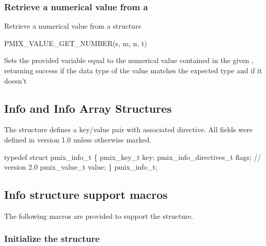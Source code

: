 \subsubsection{Retrieve a numerical value from a }

Retrieve a numerical value from a  structure

\cspecificstart
\begin{codepar}
PMIX_VALUE_GET_NUMBER(s, m, n, t)
\end{codepar}
\cspecificend

\begin{arglist}
\end{arglist}

Sets the provided variable equal to the numerical value contained in the given , returning success if the data type of the value matches the expected type and  if it doesn't

\subsection{Info and Info Array Structures}

The  structure defines a key/value pair with associated directive. All fields were defined in version 1.0 unless otherwise marked.

\cspecificstart
\begin{codepar}
typedef struct pmix_info_t \{
    pmix_key_t key;
    pmix_info_directives_t flags;    // version 2.0
    pmix_value_t value;
\} pmix_info_t;
\end{codepar}
\cspecificend

\subsection{Info structure support macros}
The following macros are provided to support the  structure.

\subsubsection{Initialize the  structure}

